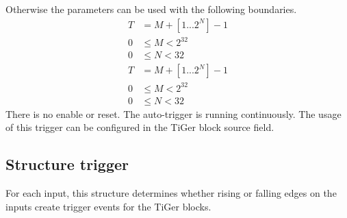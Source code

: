 \begin{description}[style=nextline]
{{            Otherwise the parameters can be used with the following boundaries.
            \begin{align*}
                T &= M + [1...2^N] - 1\\
                0 &\leq M < 2^{32}\\
                0 &\leq N < 32
            \end{align*}
       }{%
            \begin{align*}
                T &= M + [1...2^N] - 1\\
                0 &\leq M < 2^{32}\\
                0 &\leq N < 32
            \end{align*} 
        }
        \noindent There is no enable or reset. The auto-trigger is running
        continuously.  The usage of this trigger can be configured in the
        TiGer block source field.
    }
    \end{description}


\subsection{Structure \prefix trigger}
\label{structtrigger}
For each input, this structure determines whether rising or falling edges on
the inputs create trigger events for the TiGer blocks.

